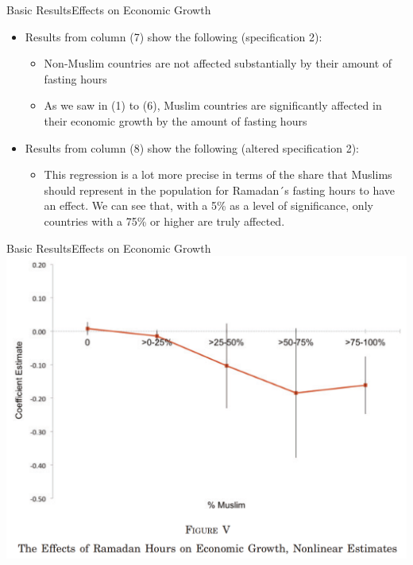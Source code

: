 \documentclass[pdftex,12pt,xcolor=pdftex,table]{beamer}
\begin{document}
    \begin{frame}{Basic Results}{Effects on Economic Growth}
    \begin{itemize}
        \item Results from column (7) show the following (specification 2):
        \begin{itemize}
            \item<2-> Non-Muslim countries are not affected substantially by their amount of fasting hours
            \item<3-> As we saw in (1) to (6), Muslim countries are significantly affected in their economic growth by the amount of fasting hours
        \end{itemize}
        \item<4-> Results from column (8) show the following (altered specification 2):
        \begin{itemize}
            \item<5-> This regression is a lot more precise in terms of the share that Muslims should represent in the population for Ramadan´s fasting hours to have an effect. We can see that, with a 5\% as a level of significance, only countries with a 75\% or higher are truly affected.
        \end{itemize}
    \end{itemize}
    \end{frame}
    
    \begin{frame}{Basic Results}{Effects on Economic Growth}
    \centering\includegraphics[scale=0.37]{POIC.png}
    \end{frame}
    
\end{document}
